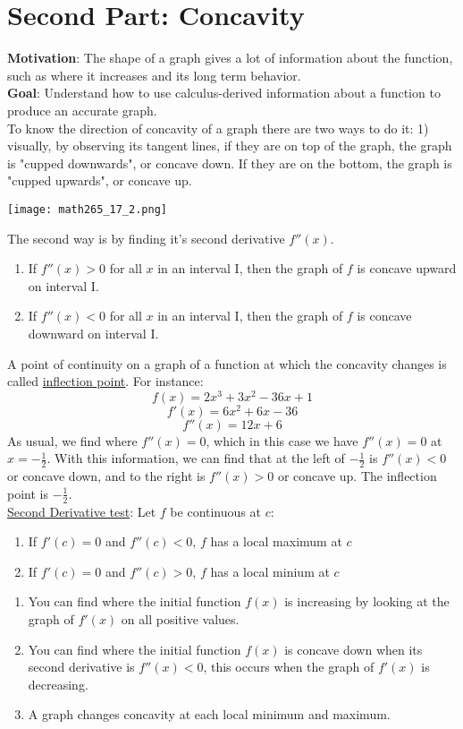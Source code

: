 \documentclass[12pt, letterpaper]{article}
\begin{document}
\section{Second Part: Concavity}
\textbf{Motivation}: The shape of a graph gives a lot of information about the function, such as where it increases and its long term behavior.\\
\newline
\textbf{Goal}: Understand how to use calculus-derived information about a function to produce an accurate graph.\\
\newline
To know the direction of concavity of a graph there are two ways to do it: 1) visually, by observing its tangent lines, if they are on top of the graph, the graph is "cupped downwards", or concave down. If they are on the bottom, the graph is "cupped upwards", or concave up. 
\begin{center}
    \texttt{[image: math265\_17\_2.png]}
\end{center}
The second way is by finding it's second derivative \(f''(x)\).\\
\newline
\begin{enumerate}
    \item If \(f''(x)>0\) for all \(x\) in an interval I, then the graph of \(f\) is concave upward on interval I.
    \item If \(f''(x)<0\) for all \(x\) in an interval I, then the graph of \(f\) is concave downward on interval I.
\end{enumerate}
A point of continuity on a graph of a function at which the concavity changes is called \underline{inflection point}. For instance:
\[f(x)=2x^3+3x^2-36x+1\]
\[f'(x)=6x^2+6x-36\]
\[f''(x)=12x+6\]
As usual, we find where \(f''(x) = 0\), which in this case we have \(f''(x) = 0\) at \(x = -\frac{1}{2}\). With this information, we can find that at the left of \(-\frac{1}{2}\) is \(f''(x)<0\) or concave down, and to the right is \(f''(x)>0\) or concave up. The inflection point is \(-\frac{1}{2}\).\\
\newline
\underline{Second Derivative test}: Let \(f\) be continuous at \(c\):
\begin{enumerate}
    \item If \(f'(c)=0\) and \(f''(c)<0\), \(f\) has a local maximum at \(c\)
    \item If \(f'(c)=0\) and \(f''(c)>0\), \(f\) has a local minium at \(c\)
\end{enumerate}
\begin{enumerate}
    \item You can find where the initial function \(f(x)\) is increasing by looking at the graph of \(f'(x)\) on all positive values.
    \item You can find where the initial function \(f(x)\) is concave down when its second derivative is \(f''(x)<0\), this occurs when the graph of \(f'(x)\) is decreasing.
    \item A graph changes concavity at each local minimum and maximum.
\end{enumerate}
\end{document}
